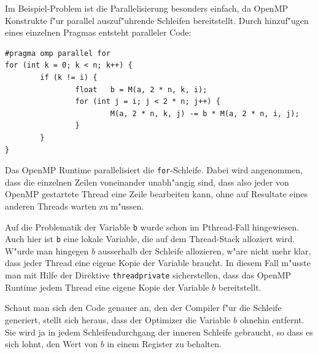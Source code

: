 Im Beispiel-Problem ist die Parallelisierung besonders einfach, da
OpenMP Konstrukte f"ur parallel auszuf"uhrende Schleifen bereitstellt.
Durch hinzuf"ugen eines einzelnen Pragmas entsteht paralleler Code:
\begin{verbatim}
#pragma omp parallel for
for (int k = 0; k < n; k++) {
        if (k != i) {
                float   b = M(a, 2 * n, k, i);
                for (int j = i; j < 2 * n; j++) {
                        M(a, 2 * n, k, j) -= b * M(a, 2 * n, i, j);
                }
        }
}
\end{verbatim}
Das OpenMP Runtime parallelisiert die {\tt for}-Schleife. Dabei wird
angenommen, dass die einzelnen Zeilen voneinander unabh"angig sind, dass
also jeder von OpenMP gestartete Thread eine Zeile bearbeiten kann,
ohne auf Resultate eines anderen Threads warten zu m"ussen.

Auf die Problematik der Variable {\tt b} wurde schon im Pthread-Fall
hingewiesen. Auch hier ist {\tt b} eine lokale Variable, die auf
dem Thread-Stack alloziert wird. W"urde man hingegen $b$ ausserhalb
der Schleife allozieren, w"are nicht mehr klar, dass jeder Thread
eine eigene Kopie der Variable braucht. In diesem Fall m"usste man
mit Hilfe der Direktive {\tt threadprivate} sicherstellen, dass
das OpenMP Runtime jedem Thread eine eigene Kopie der Variable $b$
bereitstellt.

Schaut man sich den Code genauer an, den der Compiler f"ur die Schleife
generiert, stellt sich heraus, dass der Optimizer die Variable $b$
ohnehin entfernt. Sie wird ja in jedem Schleifendurchgang der inneren
Schleife gebraucht, so dass es sich lohnt, den Wert von $b$ in einem
Register zu behalten.

